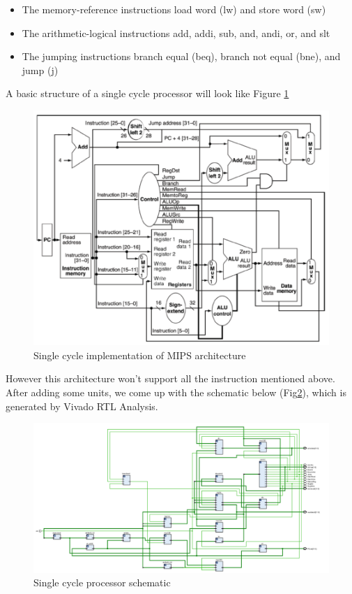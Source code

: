 \documentclass[a4paper,12pt]{article}
\begin{document}
\begin{itemize}
\item The memory-reference instructions load word (lw) and store word (sw)
\item The arithmetic-logical instructions add, addi, sub, and, andi, or, and slt
\item The jumping instructions branch equal (beq), branch not equal (bne), and jump (j)
\end{itemize} 

A basic structure of a single cycle processor will look like Figure \ref{singlecycle}

\begin{figure}[H]
\centering
\includegraphics[scale=0.5]{single_cycle_processor.PNG}
\caption{Single cycle implementation of MIPS architecture}
\label{singlecycle}
\end{figure}

However this architecture won't support all the instruction mentioned above. After adding some units, we come up with the schematic below (Fig\ref{schematic}), which is generated by Vivado RTL Analysis.

\begin{figure}[H]
\centering
\includegraphics[scale=0.5]{schematic.PNG}
\caption{Single cycle processor schematic}
\label{schematic}
\end{figure}
\end{document}
